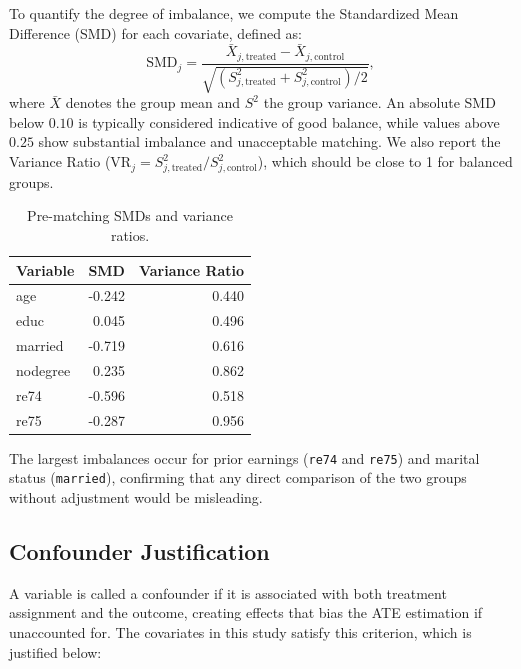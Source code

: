 \documentclass[12pt, a4paper]{article}
\begin{document}
To quantify the degree of imbalance, we compute the Standardized Mean Difference (SMD) for each covariate, defined as:
\begin{equation}
  \text{SMD}_j = \frac{\bar{X}_{j,\text{treated}} - \bar{X}_{j,\text{control}}}
                      {\sqrt{(S^2_{j,\text{treated}} + S^2_{j,\text{control}})/2}},
  \label{eq:smd}
\end{equation}
where $\bar{X}$ denotes the group mean and $S^2$ the group variance. An absolute SMD below $0.10$ is typically considered indicative of good balance, while values above $0.25$ show substantial imbalance and unacceptable matching. We also report the Variance Ratio ($\text{VR}_j = S^2_{j,\text{treated}} / S^2_{j,\text{control}}$), which should be close to 1 for balanced groups.

\begin{table}[H]
  \centering
  \caption{Pre-matching SMDs and variance ratios.}
  \label{tab:smd-pre}
  \begin{tabular}{lrr}
    \toprule
    \textbf{Variable} & \textbf{SMD} & \textbf{Variance Ratio} \\
    \midrule
    age       & -0.242& 0.440\\
    educ      & 0.045& 0.496\\
    married   & -0.719& 0.616\\
    nodegree  & 0.235& 0.862\\
    re74      & -0.596& 0.518\\
    re75      & -0.287& 0.956\\
  \end{tabular}
\end{table}

The largest imbalances occur for prior earnings (\texttt{re74} and \texttt{re75}) and marital status (\texttt{married}), confirming that any direct comparison of the two groups without adjustment would be misleading.

\subsection{Confounder Justification}

A variable is called a confounder if it is associated with both treatment assignment and the outcome, creating effects that bias the ATE estimation if unaccounted for. The covariates in this study satisfy this criterion, which is justified below:
\end{document}
